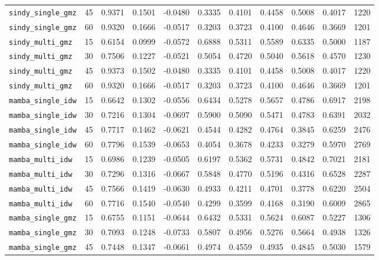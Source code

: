 \documentclass[12pt, a4paper]{article}
\begin{document}
{\begin{longtable}{p{4.0cm}cccccccccc}
\texttt{sindy\_single\_gmz} & 45 & 0.9371 & 0.1501 & -0.0480 & 0.3335 & 0.4101 & 0.4458 & 0.5008 & 0.4017 & 1220 \\
\texttt{sindy\_single\_gmz} & 60 & 0.9320 & 0.1666 & -0.0517 & 0.3203 & 0.3723 & 0.4100 & 0.4646 & 0.3669 & 1201 \\
\addlinespace[1pt]
\texttt{sindy\_multi\_gmz} & 15 & 0.6154 & 0.0999 & -0.0572 & 0.6888 & 0.5311 & 0.5589 & 0.6335 & 0.5000 & 1187 \\
\texttt{sindy\_multi\_gmz} & 30 & 0.7506 & 0.1227 & -0.0521 & 0.5054 & 0.4720 & 0.5040 & 0.5618 & 0.4570 & 1230 \\
\texttt{sindy\_multi\_gmz} & 45 & 0.9373 & 0.1502 & -0.0480 & 0.3335 & 0.4101 & 0.4458 & 0.5008 & 0.4017 & 1220 \\
\texttt{sindy\_multi\_gmz} & 60 & 0.9320 & 0.1666 & -0.0517 & 0.3203 & 0.3723 & 0.4100 & 0.4646 & 0.3669 & 1201 \\
\addlinespace[1pt]
\texttt{mamba\_single\_idw} & 15 & 0.6642 & 0.1302 & -0.0556 & 0.6434 & 0.5278 & 0.5657 & 0.4786 & 0.6917 & 2198 \\
\texttt{mamba\_single\_idw} & 30 & 0.7216 & 0.1304 & -0.0697 & 0.5900 & 0.5090 & 0.5471 & 0.4783 & 0.6391 & 2032 \\
\texttt{mamba\_single\_idw} & 45 & 0.7717 & 0.1462 & -0.0621 & 0.4544 & 0.4282 & 0.4764 & 0.3845 & 0.6259 & 2476 \\
\texttt{mamba\_single\_idw} & 60 & 0.7796 & 0.1539 & -0.0653 & 0.4054 & 0.3678 & 0.4233 & 0.3279 & 0.5970 & 2769 \\
\addlinespace[1pt]
\texttt{mamba\_multi\_idw} & 15 & 0.6986 & 0.1239 & -0.0505 & 0.6197 & 0.5362 & 0.5731 & 0.4842 & 0.7021 & 2181 \\
\texttt{mamba\_multi\_idw} & 30 & 0.7296 & 0.1316 & -0.0667 & 0.5848 & 0.4770 & 0.5196 & 0.4316 & 0.6528 & 2287 \\
\texttt{mamba\_multi\_idw} & 45 & 0.7566 & 0.1419 & -0.0630 & 0.4933 & 0.4211 & 0.4701 & 0.3778 & 0.6220 & 2504 \\
\texttt{mamba\_multi\_idw} & 60 & 0.7716 & 0.1540 & -0.0540 & 0.4299 & 0.3599 & 0.4168 & 0.3190 & 0.6009 & 2865 \\
\addlinespace[1pt]
\texttt{mamba\_single\_gmz} & 15 & 0.6755 & 0.1151 & -0.0644 & 0.6432 & 0.5331 & 0.5624 & 0.6087 & 0.5227 & 1306 \\
\texttt{mamba\_single\_gmz} & 30 & 0.7093 & 0.1248 & -0.0733 & 0.5807 & 0.4956 & 0.5276 & 0.5664 & 0.4938 & 1326 \\
\texttt{mamba\_single\_gmz} & 45 & 0.7448 & 0.1347 & -0.0661 & 0.4974 & 0.4559 & 0.4935 & 0.4845 & 0.5030 & 1579 \\

\end{longtable}}
\end{document}
